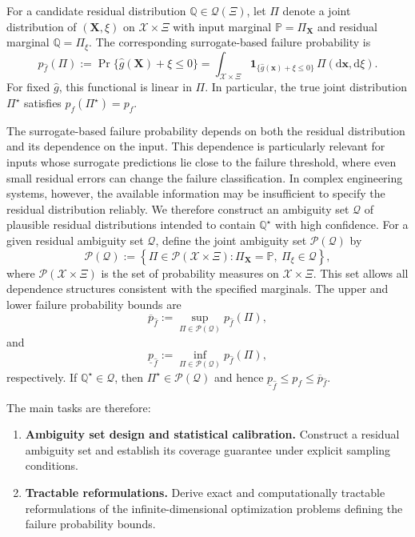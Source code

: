 \documentclass[review,11pt,3p,authoryear,nopreprintline]{elsarticle}
\begin{document}
For a candidate residual distribution $\mathbb Q\in\mathcal Q(\Xi)$, let $\Pi$ denote a joint distribution of $(\bm X,\xi)$ on $\mathcal X\times\Xi$ with input marginal $\mathbb P = \Pi_{\bm X}$ and residual marginal $\mathbb Q = \Pi_{\xi}$. The corresponding surrogate-based failure probability is
\begin{equation}
  p_{\hat f}(\Pi):=\Pr\{\hat g(\bm X)+\xi\le0\}=\int_{\mathcal X\times\Xi}\mathbf 1_{\{\hat g(\bm x)+\xi\le0\}}\,\Pi(\mathrm d\bm x,\mathrm d\xi).
  \label{eq-surrogate-failure-probability}
\end{equation}
For fixed $\hat g$, this functional is linear in $\Pi$. In particular, the true joint distribution $\Pi^\star$ satisfies $p_{\hat f}(\Pi^\star)=p_f$.

The surrogate-based failure probability depends on both the residual distribution and its dependence on the input. This dependence is particularly relevant for inputs whose surrogate predictions lie close to the failure threshold, where even small residual errors can change the failure classification. In complex engineering systems, however, the available information may be insufficient to specify the residual distribution reliably. We therefore construct an ambiguity set $\mathscr Q$ of plausible residual distributions intended to contain $\mathbb Q^\star$ with high confidence. For a given residual ambiguity set $\mathscr Q$, define the joint ambiguity set $\mathscr P(\mathscr Q)$ by
\[
  \mathscr P(\mathscr Q) :=\left\{\Pi\in\mathcal P(\mathcal X\times\Xi):\Pi_{\bm X}=\mathbb P,\ \Pi_\xi\in\mathscr Q\right\},
\]
where $\mathcal P(\mathcal X\times\Xi)$ is the set of probability measures on $\mathcal X\times\Xi$. This set allows all dependence structures consistent with the specified marginals. The upper and lower failure probability bounds are
\begin{equation}
  \overline p_{\hat f}:=\sup_{\Pi\in\mathscr P(\mathscr Q)}p_{\hat f}(\Pi),
  \label{eq-upper-bound}
\end{equation}
and
\begin{equation}
  \underline p_{\hat f}:=\inf_{\Pi\in\mathscr P(\mathscr Q)}p_{\hat f}(\Pi),
  \label{eq-lower-bound}
\end{equation}
respectively. If $\mathbb Q^\star\in\mathscr Q$, then $\Pi^\star\in\mathscr P(\mathscr Q)$ and hence $\underline p_{\hat f}\le p_f\le\overline p_{\hat f}$.

The main tasks are therefore:
\begin{enumerate}
  \item \textbf{Ambiguity set design and statistical calibration.} Construct a residual ambiguity set and establish its coverage guarantee under explicit sampling conditions.
  \item \textbf{Tractable reformulations.} Derive exact and computationally tractable reformulations of the infinite-dimensional optimization problems defining the failure probability bounds.
\end{enumerate}
\end{document}
